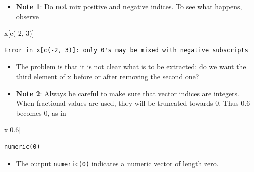 \documentclass[
  9pt,
  a4paper,
  ignorenonframetext,
  notheorems]{beamer}
\newenvironment{Shaded}{\begin{snugshade}}{\end{snugshade}}
\newcommand{\DecValTok}[1]{\textcolor[rgb]{0.68,0.00,0.00}{#1}}
\newcommand{\FloatTok}[1]{\textcolor[rgb]{0.68,0.00,0.00}{#1}}
\newcommand{\FunctionTok}[1]{\textcolor[rgb]{0.28,0.35,0.67}{#1}}
\newcommand{\NormalTok}[1]{\textcolor[rgb]{0.00,0.23,0.31}{#1}}
\newcommand{\SpecialCharTok}[1]{\textcolor[rgb]{0.37,0.37,0.37}{#1}}
\providecommand{\tightlist}{%
  \setlength{\itemsep}{0pt}\setlength{\parskip}{0pt}}\usepackage{longtable,booktabs,array}
\begin{document}
\begin{frame}[fragile]
\begin{itemize}
\tightlist
\item
  \textbf{Note 1}: Do \textbf{not} mix positive and negative indices. To
  see what happens, observe
\end{itemize}

\begin{Shaded}
\begin{Highlighting}[]
\NormalTok{x[}\FunctionTok{c}\NormalTok{(}\SpecialCharTok{{-}}\DecValTok{2}\NormalTok{, }\DecValTok{3}\NormalTok{)]}
\end{Highlighting}
\end{Shaded}

\begin{verbatim}
Error in x[c(-2, 3)]: only 0's may be mixed with negative subscripts
\end{verbatim}

\begin{itemize}
\item
  The problem is that it is not clear what is to be extracted: do we
  want the third element of x before or after removing the second one?
\item
  \textbf{Note 2}: Always be careful to make sure that vector indices
  are integers. When fractional values are used, they will be truncated
  towards 0. Thus 0.6 becomes 0, as in
\end{itemize}

\begin{Shaded}
\begin{Highlighting}[]
\NormalTok{x[}\FloatTok{0.6}\NormalTok{]}
\end{Highlighting}
\end{Shaded}

\begin{verbatim}
numeric(0)
\end{verbatim}

\begin{itemize}
\tightlist
\item
  The output \texttt{numeric(0)} indicates a numeric vector of length
  zero.
\end{itemize}
\end{frame}
\end{document}
